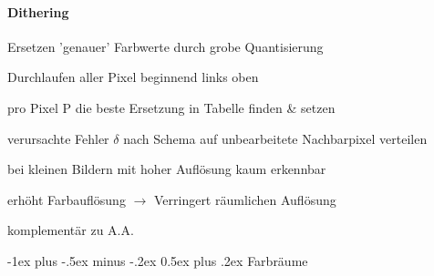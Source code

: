 \documentclass[landscape]{article}
\makeatletter
\renewcommand{\section}{\@startsection{section}{1}{0mm}%
                                {-1ex plus -.5ex minus -.2ex}%
                                {0.5ex plus .2ex}%
                                {\normalfont\large\bfseries}}
\makeatother
\begin{document}
\begin{multicols}{3}
  \paragraph{Dithering}
  \begin{itemize*}
    \item Ersetzen 'genauer' Farbwerte durch grobe Quantisierung
    \item Durchlaufen aller Pixel beginnend links oben
    \item pro Pixel P die beste Ersetzung in Tabelle finden \& setzen
    \item verursachte Fehler $\delta$ nach Schema auf unbearbeitete Nachbarpixel verteilen
    \item bei kleinen Bildern mit hoher Auflösung kaum erkennbar
    \item erhöht Farbauflösung $\rightarrow$ Verringert räumlichen Auflösung
    \item komplementär zu A.A.
  \end{itemize*}
  
  \newpage
  \section{Farbräume}


\end{multicols}
\end{document}

